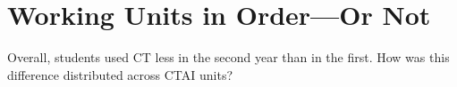 \documentclass[12pt]{article}\usepackage[]{graphicx}\usepackage[]{color}
\begin{document}

\section{Working Units in Order---Or Not}\label{sec:order}

Overall, students used CT less in the second year than in the
first.
How was this difference distributed across CTAI units?
\end{document}
